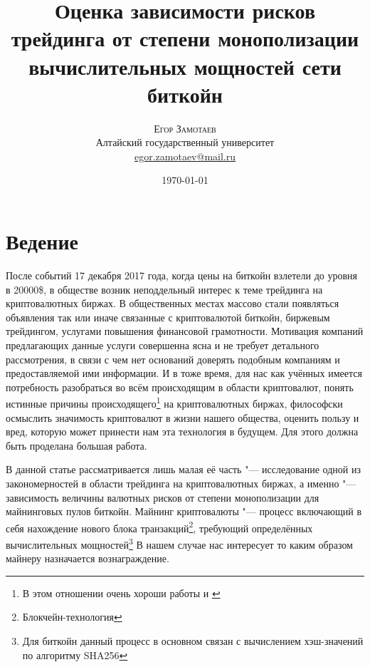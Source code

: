 \documentclass[12pt]{article}
\title{Оценка зависимости рисков трейдинга от степени монополизации вычислительных мощностей сети биткойн} %
\author{%
\textsc{Егор Замотаев} \\[1ex] %
\normalsize Алтайский государственный университет \\ %
\normalsize \href{mailto:egor.zamotaev@mail.ru}{egor.zamotaev@mail.ru} %
}
\date{\today} %
\begin{document}
\maketitle


\section{Ведение}

После событий 17 декабря 2017 года, когда цены на биткойн взлетели до уровня в 20000\$, в обществе возник неподдельный интерес к теме трейдинга на криптовалютных биржах. В общественных местах массово стали появляться объявления так или иначе связанные с криптовалютой биткойн, биржевым трейдингом, услугами повышения финансовой грамотности. Мотивация компаний предлагающих данные услуги совершенна ясна и не требует детального рассмотрения, в связи с чем нет оснований доверять подобным компаниям и предоставляемой ими информации. И в тоже время, для нас как учённых имеется потребность разобраться во всём происходящим в области криптовалют, понять истинные причины происходящего\footnote{В этом отношении очень хороши работы \cite{Malanov} и \cite{Dembinskaya}} на криптовалютных биржах, философски осмыслить значимость криптовалют в жизни нашего общества, оценить пользу и вред, которую может принести нам эта технология в будущем. Для этого должна быть проделана большая работа.
\par В данной статье рассматривается лишь малая её часть "--- исследование одной из закономерностей в области трейдинга на криптовалютных биржах, а именно "--- зависимость величины валютных рисков от степени монополизации для майнинговых пулов биткойн. Майнинг криптовалюты "--- процесс включающий в себя нахождение нового блока транзакций\footnote{Блокчейн-технология}, требующий определённых вычислительных мощностей\footnote{Для биткойн данный процесс в основном связан с вычислением хэш-значений по алгоритму SHA256} В нашем случае нас интересует то каким образом майнеру назначается вознаграждение. 
\end{document}
